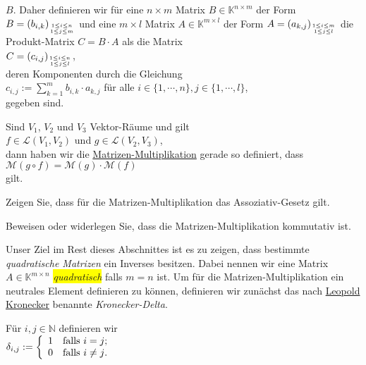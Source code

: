$B$.  Daher definieren wir f\"{u}r eine 
$n \times m$ Matrix $B \in \mathbb{K}^{n \times m}$ der Form $B = (b_{i,k})_{1\leq i \leq n \atop 1 \leq j \leq m}$ und eine $m \times l$ Matrix
$A \in \mathbb{K}^{m \times l}$ der Form $A = (a_{k,j})_{1\leq i \leq m \atop 1 \leq j \leq l}$ die Produkt-Matrix $C= B \cdot A$ als die
Matrix
\\[0.2cm]
\hspace*{1.3cm}
$C = (c_{i,j})_{1\leq i \leq n \atop 1 \leq j \leq l}$, 
\\[0.2cm]
deren Komponenten durch die Gleichung
\\[0.2cm]
\hspace*{1.3cm}
$c_{i,j} := \sum\limits_{k=1}^m b_{i,k} \cdot a_{k,j}$ \quad f\"{u}r alle $i \in \{1,\cdots,n\}, j \in\{1,\cdots,l\}$,
\\[0.2cm]
gegeben sind.

\remark
Sind $V_1$, $V_2$ und $V_3$ Vektor-R\"{a}ume und gilt
\\[0.2cm]
\hspace*{1.3cm}
 $f \in \mathcal{L}(V_1, V_2)$ und $g \in \mathcal{L}(V_2, V_3)$,
\\[0.2cm]
dann haben wir die 
\href{http://de.wikipedia.org/wiki/Matrizenmultiplikation}{Matrizen-Multiplikation} gerade so definiert, dass
\\[0.2cm]
\hspace*{1.3cm}
$\mathcal{M}(g \circ f) = \mathcal{M}(g) \cdot \mathcal{M}(f)$
\\[0.2cm]
gilt.  \eoxs

\exercise
Zeigen Sie, dass f\"{u}r die Matrizen-Multiplikation das Assoziativ-Gesetz gilt.
\eoxs

\exercise
Beweisen oder widerlegen Sie, dass die Matrizen-Multiplikation kommutativ ist.
\eox

Unser Ziel im Rest dieses Abschnittes ist es zu zeigen, dass bestimmte \emph{quadratische Matrizen} ein
Inverses besitzen.  Dabei nennen wir eine Matrix $A \in \mathbb{K}^{m \times n}$ \colorbox{yellow}{\emph{quadratisch}}
falls $m = n$ ist.  Um f\"{u}r die Matrizen-Multiplikation ein neutrales Element definieren zu k\"{o}nnen,
definieren wir zun\"{a}chst das nach 
\href{http://de.wikipedia.org/wiki/Leopold_Kronecker}{Leopold Kronecker} benannte \emph{Kronecker-Delta}.


\begin{Definition}
  F\"{u}r $i,j \in \mathbb{N}$ definieren wir
  \\[0.2cm]
  \hspace*{1.3cm}
  $\delta_{i,j} := \left\{
                  \begin{array}[c]{ll}
                    1 & \mbox{falls $i = j$;} \\
                    0 & \mbox{falls $i \not= j$}.
                  \end{array}
                  \right.
  $
\eoxs
\end{Definition}

